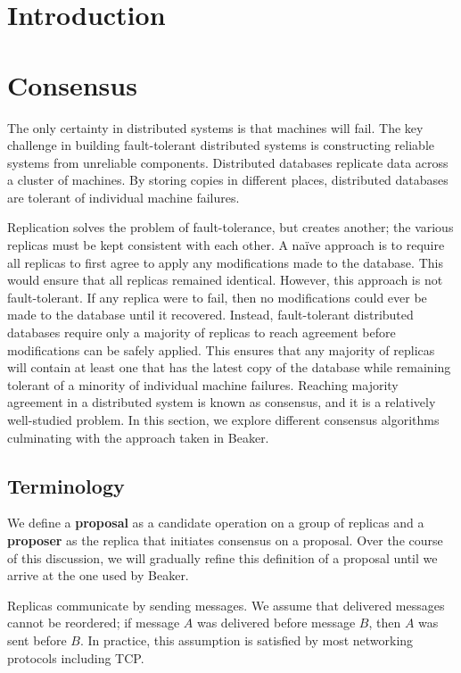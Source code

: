 \documentclass[../main.tex]{subfiles}
\begin{document}
\section{Introduction}

\section{Consensus}
The only certainty in distributed systems is that machines will fail. The key challenge in building
fault-tolerant distributed systems is constructing reliable systems from unreliable components.
\cite{reliability} Distributed databases replicate data across a cluster of machines. By storing
copies in different places, distributed databases are tolerant of individual machine failures.

Replication solves the problem of fault-tolerance, but creates another; the various replicas must be
kept consistent with each other. A na\"ive approach is to require all replicas to first agree to
apply any modifications made to the database. This would ensure that all replicas remained
identical. However, this approach is not fault-tolerant. If any replica were to fail, then no
modifications could ever be made to the database until it recovered. Instead, fault-tolerant
distributed databases require only a majority of replicas to reach agreement before modifications
can be safely applied. This ensures that any majority of replicas will contain at least one that has
the latest copy of the database while remaining tolerant of a minority of individual machine
failures. Reaching majority agreement in a distributed system is known as consensus, and it is a
relatively well-studied problem. In this section, we explore different consensus algorithms
culminating with the approach taken in Beaker.

  \subsection{Terminology}
  We define a \textbf{proposal} as a candidate operation on a group of replicas and a
  \textbf{proposer} as the replica that initiates consensus on a proposal. Over the course of this
  discussion, we will gradually refine this definition of a proposal until we arrive at the one used
  by Beaker.

  Replicas communicate by sending messages. We assume that delivered messages cannot be reordered;
  if message $A$ was delivered before message $B$, then $A$ was sent before $B$. In practice, this
  assumption is satisfied by most networking protocols including TCP.
\end{document}
